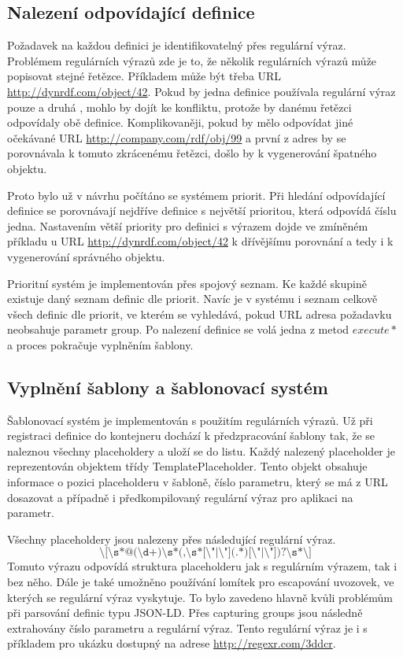 \documentclass[thesis=B,czech]{FITthesis}[2012/06/26]
\begin{document}
  \subsection{Nalezení odpovídající definice}\label{find_def}
  Požadavek na každou definici je identifikovatelný přes regulární výraz. Problémem regulárních výrazů zde je to, že několik regulárních výrazů může popisovat
  stejné řetězce. Příkladem může být třeba URL \url{http://dynrdf.com/object/42}. Pokud by jedna definice používala regulární výraz pouze  a druhá , mohlo
  by dojít ke konfliktu, protože by danému řetězci odpovídaly obě definice. Komplikovaněji, pokud by  mělo odpovídat jiné očekávané URL
  \url{http://company.com/rdf/obj/99} a první z adres by se porovnávala k tomuto zkrácenému řetězci, došlo by k vygenerování špatného objektu.
  
  Proto bylo už v návrhu počítáno se systémem priorit. Při hledání odpovídající definice se porovnávají nejdříve definice s největší prioritou, která odpovídá číslu jedna.
  Nastavením větší priority pro definici s výrazem  dojde ve zmíněném příkladu u URL \url{http://dynrdf.com/object/42} k dřívějšímu porovnání a tedy i 
  k vygenerování správného objektu.
  
  Prioritní systém je implementován přes spojový seznam. Ke každé skupině existuje daný seznam definic dle priorit. Navíc je v systému i seznam celkově všech
  definic dle priorit, ve kterém se vyhledává, pokud URL adresa požadavku neobsahuje parametr group. Po nalezení definice se volá jedna z metod $execute*$ a 
  proces pokračuje vyplněním šablony.
  
  \subsection{Vyplnění šablony a šablonovací systém}
  Šablonovací systém je implementován s použitím regulárních výrazů. Už při registraci definice do kontejneru dochází k předzpracování šablony tak, že se naleznou
  všechny placeholdery a uloží se do listu. Každý nalezený placeholder je reprezentován objektem třídy TemplatePlaceholder. Tento objekt obsahuje informace o pozici
  placeholderu v šabloně, číslo parametru, který se má z URL dosazovat a případně i předkompilovaný regulární výraz pro aplikaci na parametr. 
  
  Všechny placeholdery jsou nalezeny přes následující regulární výraz.
   \begin{equation}
  \texttt{\textbackslash[\textbackslash s*@(\textbackslash d+)\textbackslash s*(,\textbackslash s*[\textbackslash"|\textbackslash"](.*)[\textbackslash"|\textbackslash"])?\textbackslash s*\textbackslash]} 
 \end{equation}
  Tomuto výrazu odpovídá struktura placeholderu jak s regulárním výrazem, tak i bez něho. Dále je také umožněno používání lomítek pro escapování uvozovek,
  ve kterých se regulární výraz vyskytuje. To bylo zavedeno hlavně kvůli problémům při parsování definic typu JSON-LD. Přes capturing groups jsou následně extrahovány
  číslo parametru a regulární výraz. Tento regulární výraz je i s příkladem pro ukázku dostupný na adrese \url{http://regexr.com/3ddcr}.
  
\end{document}
